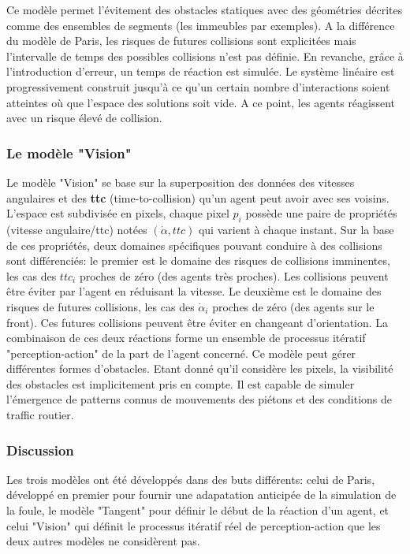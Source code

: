 \documentclass[11pt]{article}
\begin{document}
Ce modèle permet l'évitement des obstacles statiques avec des géométries décrites comme des ensembles de segments (les immeubles par exemples).
A la différence du modèle de Paris, les risques de futures collisions sont explicitées mais l'intervalle de temps des possibles collisions n'est pas définie. En revanche, grâce à l'introduction d'erreur, un temps de réaction est simulée. Le système linéaire est progressivement construit jusqu'à ce qu'un certain nombre d'interactions soient atteintes où que l'espace des solutions soit vide. A ce point, les agents réagissent avec un risque élevé de collision.

\subsubsection*{Le modèle "Vision"}

Le modèle "Vision" se base sur la superposition des données des vitesses angulaires et des \textbf{ttc} (time-to-collision) qu'un agent peut avoir avec ses voisins. L'espace est subdivisée en pixels, chaque pixel $p_i$ possède une paire de propriétés (vitesse angulaire/ttc) notées $(\dot{\alpha}, ttc)$ qui varient à chaque instant. Sur la base de ces propriétés, deux domaines spécifiques pouvant conduire à des collisions sont différenciés: le premier est le domaine des risques de collisions imminentes, les cas des $ttc_{i}$ proches de zéro (des agents très proches). Les collisions peuvent être éviter par l'agent en réduisant la vitesse. Le deuxième est le domaine des risques de futures collisions, les cas des $\dot{\alpha}_i$ proches de zéro (des agents sur le front). Ces futures collisions peuvent être éviter en changeant d'orientation. La combinaison de ces deux réactions forme un ensemble de processus itératif "perception-action" de la part de l'agent concerné.
Ce modèle peut gérer différentes formes d'obstacles. Etant donné qu'il considère les pixels, la visibilité des obstacles est implicitement pris en compte. Il est capable de simuler l'émergence de patterns connus de mouvements des piétons et des conditions de traffic routier.

\subsubsection{Discussion}

Les trois modèles ont été développés dans des buts différents: celui de Paris, développé en premier pour fournir une adapatation anticipée de la simulation de la foule, le modèle "Tangent" pour définir le début de la réaction d'un agent, et celui "Vision" qui définit le processus itératif réel de perception-action que les deux autres modèles ne considèrent pas.
\end{document}
